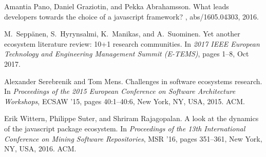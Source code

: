 \documentclass[10pt,conference]{IEEEtran}
\begin{document}
\begin{thebibliography}{00}
  Amantia Pano, Daniel Graziotin, and Pekka Abrahamsson.
  \newblock What leads developers towards the choice of a javascript framework?
  , abs/1605.04303, 2016.
  
  M.~{Seppänen}, S.~{Hyrynsalmi}, K.~{Manikas}, and A.~{Suominen}.
  \newblock Yet another ecosystem literature review: 10+1 research communities.
  \newblock In {\em 2017 IEEE European Technology and Engineering Management
    Summit (E-TEMS)}, pages 1--8, Oct 2017.
  
  Alexander Serebrenik and Tom Mens.
  \newblock Challenges in software ecosystems research.
  \newblock In {\em Proceedings of the 2015 European Conference on Software
    Architecture Workshops}, ECSAW '15, pages 40:1--40:6, New York, NY, USA,
    2015. ACM.
  
  Erik Wittern, Philippe Suter, and Shriram Rajagopalan.
  \newblock A look at the dynamics of the javascript package ecosystem.
  \newblock In {\em Proceedings of the 13th International Conference on Mining
    Software Repositories}, MSR '16, pages 351--361, New York, NY, USA, 2016.
    ACM.
  \end{thebibliography}
  
\vspace{12pt}
\end{document}
